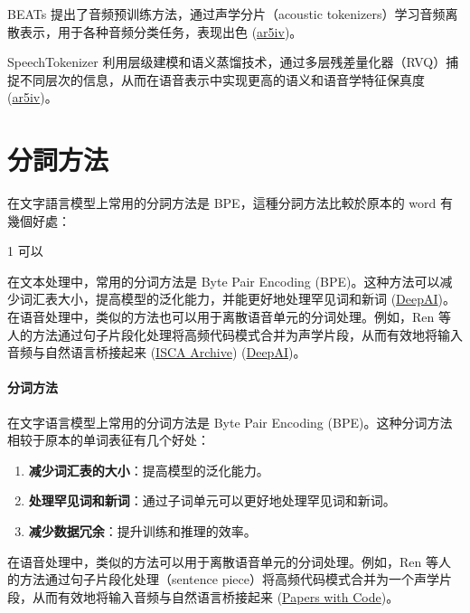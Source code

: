 BEATs 提出了音频预训练方法，通过声学分片（acoustic tokenizers）学习音频离散表示，用于各种音频分类任务，表现出色 (\href{https://ar5iv.org/abs/2212.09058}{ar5iv})。

SpeechTokenizer 利用层级建模和语义蒸馏技术，通过多层残差量化器（RVQ）捕捉不同层次的信息，从而在语音表示中实现更高的语义和语音学特征保真度 (\href{https://ar5iv.org/pdf/2308.16692}{ar5iv})。





\section{分詞方法}


在文字語言模型上常用的分詞方法是 BPE，這種分詞方法比較於原本的 word 有幾個好處：

1 可以


 在文本处理中，常用的分词方法是 Byte Pair Encoding (BPE)。这种方法可以减少词汇表大小，提高模型的泛化能力，并能更好地处理罕见词和新词 (\href{https://deepai.org/publication/speech-pre-training-with-acoustic-piece}{DeepAI})。在语音处理中，类似的方法也可以用于离散语音单元的分词处理。例如，Ren 等人的方法通过句子片段化处理将高频代码模式合并为声学片段，从而有效地将输入音频与自然语言桥接起来 (\href{https://www.isca-archive.org/interspeech_2022/ren22_interspeech.html}{ISCA Archive}) (\href{https://deepai.org/publication/speech-pre-training-with-acoustic-piece}{DeepAI})。 


\paragraph{分词方法}

在文字语言模型上常用的分词方法是 Byte Pair Encoding (BPE)。这种分词方法相较于原本的单词表征有几个好处：

\begin{enumerate}
    \item \textbf{减少词汇表的大小}：提高模型的泛化能力。
    \item \textbf{处理罕见词和新词}：通过子词单元可以更好地处理罕见词和新词。
    \item \textbf{减少数据冗余}：提升训练和推理的效率。
\end{enumerate}
在语音处理中，类似的方法可以用于离散语音单元的分词处理。例如，Ren 等人的方法通过句子片段化处理（sentence piece）将高频代码模式合并为一个声学片段，从而有效地将输入音频与自然语言桥接起来 (\href{https://paperswithcode.com/paper/speech-pre-training-with-acoustic-piece}{Papers with Code})。

